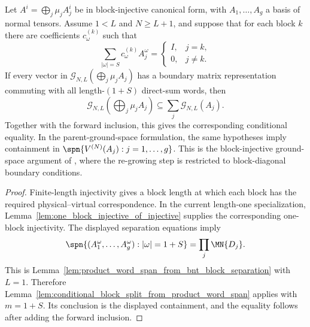 \begin{lemma}
    \label{lem:conditional_block_split_from_bnt_block_separation}
    \notready
    Let $A^i=\bigoplus_j\mu_j A_j^i$ be in block-injective canonical form, with
    $A_1,\ldots,A_g$ a basis of normal tensors.  Assume $1 < L$ and
    $N \ge L + 1$, and suppose
    that for each block $k$ there are coefficients $c_\omega^{(k)}$ such that
    \[
        \sum_{|\omega|=S} c_\omega^{(k)} A_j^\omega
        =
        \begin{cases}
            I, & j=k,    \\
            0, & j\ne k.
        \end{cases}
    \]
    If every vector in
    $\mathcal G_{N,L}\!\left(\bigoplus_j \mu_j A_j\right)$ has a boundary matrix
    representation commuting with all length-$(1 + S)$ direct-sum words, then
    \[
        \mathcal G_{N,L}\!\left(\bigoplus_j \mu_j A_j\right)
        \subseteq \sum_j \mathcal G_{N,L}(A_j).
    \]
    Together with the forward inclusion, this gives the corresponding
    conditional equality. In the parent-ground-space formulation, the same
    hypotheses imply containment in $\spn\{V^{(N)}(A_j): j=1,\ldots,g\}$. This
    is the block-injective ground-space argument of
    \cite[lines~2120--2128]{Cirac2021Matrix}, where the re-growing step is
    restricted to block-diagonal boundary conditions.
\end{lemma}

\begin{proof}
    \notready
    Finite-length injectivity gives a block length at which each block has the
    required physical--virtual correspondence. In the current length-one
    specialization, Lemma~\ref{lem:one_block_injective_of_injective} supplies
    the corresponding one-block injectivity. The displayed separation equations imply
    \[
        \spn\{(A_1^\omega,\ldots,A_g^\omega):|\omega|=1+S\}
        =
        \prod_j\MN{D_j}.
    \]
    This is Lemma~\ref{lem:product_word_span_from_bnt_block_separation} with $L=1$.
    Therefore Lemma~\ref{lem:conditional_block_split_from_product_word_span}
    applies with $m=1+S$. Its conclusion is the displayed containment, and the
    equality follows after adding the forward inclusion.
\end{proof}

